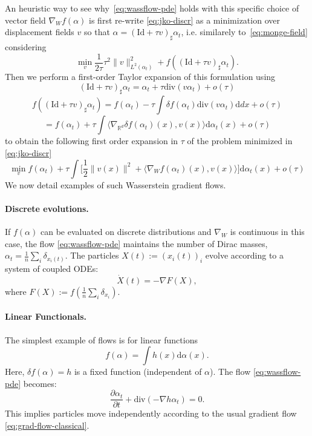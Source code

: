 An heuristic way to see why~\eqref{eq:wassflow-pde} holds with this specific choice of vector field $\nabla_W f(\alpha)$ is first re-write \eqref{eq:jko-discr} as a minimization over displacement fields $v$ so that $\alpha = (\mathrm{Id} + \tau v)_\sharp \alpha_t$, i.e. similarely to~\eqref{eq:monge-field} considering
$$
	\min_{v} \frac{1}{2 \tau} \tau^2 \|v\|_{L^2(\alpha_t)}^2 + f( (\mathrm{Id} + \tau v)_\sharp \alpha_t ).
$$
Then we perform a first-order Taylor expansion of this formulation using 
$$
	 (\mathrm{Id} + \tau v)_\sharp \alpha_t =  \alpha_t + \tau \mathrm{div}( v \alpha_t ) + o(\tau)
$$
$$
	f( (\mathrm{Id} + \tau v)_\sharp \alpha_t ) = f(\alpha_t) - \tau \int \delta f(\alpha_t) \mathrm{div}( v \alpha_t ) \mathrm{d} d x + o(\tau)
$$
$$
	 = f(\alpha_t) + \tau \int \langle \nabla_{\mathbb{R}^d} \delta f(\alpha_t)(x), v(x) \rangle \mathrm{d} \alpha_t(x) + o(\tau)
$$
to obtain the following first order expansion in $\tau$ of the problem minimized in  \eqref{eq:jko-discr}
$$
	 \min_{v} f(\alpha_t) +  \tau \int \Big[ \frac{1}{2} \|v(x)\|^2 + \langle \nabla_{W} f(\alpha_t)(x), v(x) \rangle \Big]\mathrm{d} \alpha_t(x) + o(\tau)
$$
We now detail examples of such Wasserstein gradient flows.

\paragraph{Discrete evolutions.}

If $f(\alpha)$ can be evaluated on discrete distributions and $\nabla_W$ is continuous in this case, the flow \eqref{eq:wassflow-pde} maintains the number of Dirac masses, $\alpha_t = \frac{1}{n} \sum_i \delta_{x_i(t)}$. The particles $X(t) := (x_i(t))_i$ evolve according to a system of coupled ODEs:
\begin{equation}
    \dot{X}(t) = -\nabla F(X), \label{eq:wassflows-particles}
\end{equation}
where $F(X) := f\left(\frac{1}{n} \sum_i \delta_{x_i}\right)$.
 
\paragraph{Linear Functionals.} The simplest example of flows is for linear functions
   \begin{equation}\label{eq:linear-func}
       f(\alpha) = \int h(x) \mathrm{d} \alpha(x). 
   \end{equation}
   Here, $\delta f(\alpha) = h$ is a fixed function (independent of $\alpha$). The flow \eqref{eq:wassflow-pde} becomes:
   \begin{equation*}
       \frac{\partial \alpha_t}{\partial t} + \mathrm{div}(-\nabla h \alpha_t) = 0.
   \end{equation*}
   This implies particles move independently according to the usual gradient flow \eqref{eq:grad-flow-classical}.

